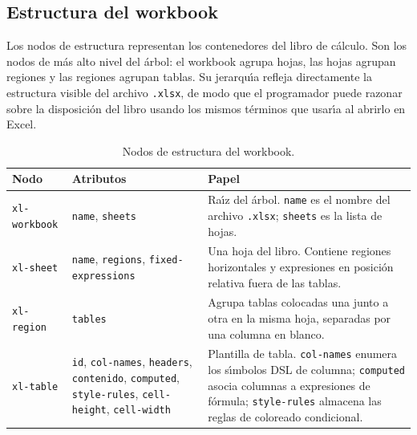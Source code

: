\documentclass[12pt,a4paper]{report}
\begin{document}
\subsection{Estructura del workbook}
\label{sec:ast-estructura}

Los nodos de estructura representan los contenedores del libro de c\'alculo.
Son los nodos de m\'as alto nivel del \'arbol: el workbook agrupa hojas, las
hojas agrupan regiones y las regiones agrupan tablas.  Su jerarqu\'{\i}a
refleja directamente la estructura visible del archivo \texttt{.xlsx}, de
modo que el programador puede razonar sobre la disposici\'on del libro
usando los mismos t\'erminos que usar\'{\i}a al abrirlo en Excel.

\begin{table}[h!]
\centering
\caption{Nodos de estructura del workbook.}
\label{tab:ast-estructura}
\renewcommand{\arraystretch}{1.3}
\begin{tabular}{p{3.6cm} p{4.8cm} p{5.4cm}}
\hline
\textbf{Nodo} & \textbf{Atributos} & \textbf{Papel} \\
\hline
\texttt{xl-workbook}
  & \texttt{name}, \texttt{sheets}
  & Ra\'{\i}z del \'arbol.  \texttt{name} es el nombre del
    archivo \texttt{.xlsx}; \texttt{sheets} es la lista de
    hojas. \\
\hline
\texttt{xl-sheet}
  & \texttt{name}, \texttt{regions},\newline
    \texttt{fixed-expressions}
  & Una hoja del libro.  Contiene regiones horizontales y
    expresiones en posici\'on relativa fuera de las tablas. \\
\hline
\texttt{xl-region}
  & \texttt{tables}
  & Agrupa tablas colocadas una junto a otra en la misma
    hoja, separadas por una columna en blanco. \\
\hline
\texttt{xl-table}
  & \texttt{id}, \texttt{col-names},\newline
    \texttt{headers}, \texttt{contenido},\newline
    \texttt{computed}, \texttt{style-rules},\newline
    \texttt{cell-height}, \texttt{cell-width}
  & Plantilla de tabla.  \texttt{col-names} enumera los
    s\'{\i}mbolos DSL de columna; \texttt{computed} asocia
    columnas a expresiones de f\'ormula; \texttt{style-rules}
    almacena las reglas de coloreado condicional. \\
\hline
\end{tabular}
\end{table}
\end{document}

